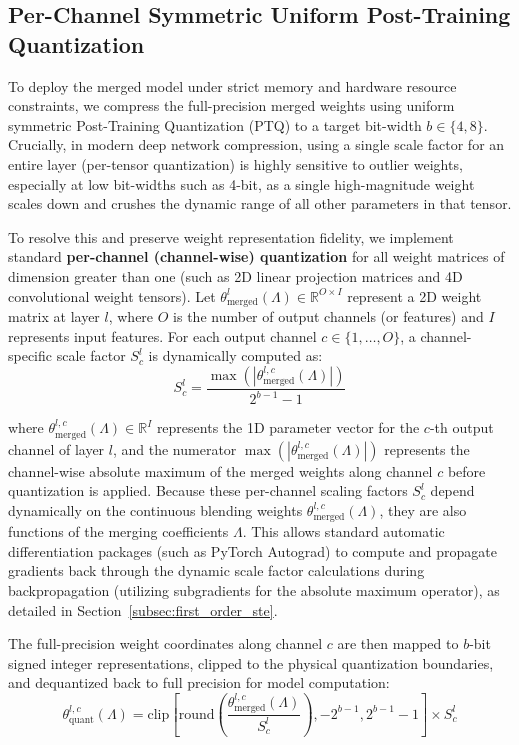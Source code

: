 \subsection{Per-Channel Symmetric Uniform Post-Training Quantization}
To deploy the merged model under strict memory and hardware resource constraints, we compress the full-precision merged weights using uniform symmetric Post-Training Quantization (PTQ) to a target bit-width $b \in \{4, 8\}$. Crucially, in modern deep network compression, using a single scale factor for an entire layer (per-tensor quantization) is highly sensitive to outlier weights, especially at low bit-widths such as 4-bit, as a single high-magnitude weight scales down and crushes the dynamic range of all other parameters in that tensor. 

To resolve this and preserve weight representation fidelity, we implement standard \textbf{per-channel (channel-wise) quantization} for all weight matrices of dimension greater than one (such as 2D linear projection matrices and 4D convolutional weight tensors). Let $\theta^l_{\text{merged}}(\Lambda) \in \mathbb{R}^{O \times I}$ represent a 2D weight matrix at layer $l$, where $O$ is the number of output channels (or features) and $I$ represents input features. For each output channel $c \in \{1, \dots, O\}$, a channel-specific scale factor $S^l_c$ is dynamically computed as:
\begin{equation}
    S^l_c = \frac{\max\left(\left|\theta^{l,c}_{\text{merged}}(\Lambda)\right|\right)}{2^{b-1} - 1}
\end{equation}

where $\theta^{l,c}_{\text{merged}}(\Lambda) \in \mathbb{R}^I$ represents the 1D parameter vector for the $c$-th output channel of layer $l$, and the numerator $\max\left(\left|\theta^{l,c}_{\text{merged}}(\Lambda)\right|\right)$ represents the channel-wise absolute maximum of the merged weights along channel $c$ before quantization is applied. Because these per-channel scaling factors $S^l_c$ depend dynamically on the continuous blending weights $\theta^{l,c}_{\text{merged}}(\Lambda)$, they are also functions of the merging coefficients $\Lambda$. This allows standard automatic differentiation packages (such as PyTorch Autograd) to compute and propagate gradients back through the dynamic scale factor calculations during backpropagation (utilizing subgradients for the absolute maximum operator), as detailed in Section~\ref{subsec:first_order_ste}.

The full-precision weight coordinates along channel $c$ are then mapped to $b$-bit signed integer representations, clipped to the physical quantization boundaries, and dequantized back to full precision for model computation:
\begin{equation}
    \theta^{l,c}_{\text{quant}}(\Lambda) = \text{clip}\left[ \text{round}\left(\frac{\theta^{l,c}_{\text{merged}}(\Lambda)}{S^l_c}\right), -2^{b-1}, 2^{b-1}-1 \right] \times S^l_c
\end{equation}

